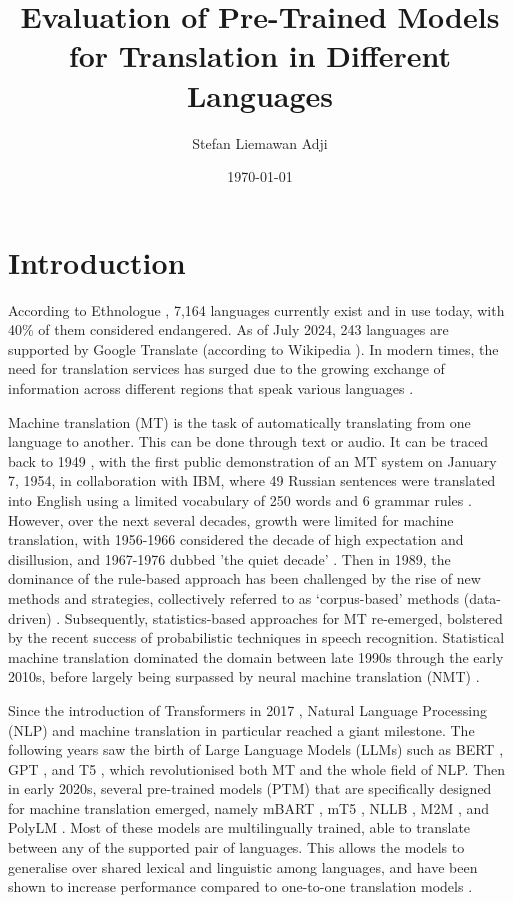 \documentclass[a4paper]{article}
\title{Evaluation of Pre-Trained Models for Translation in Different Languages}
\author{Stefan Liemawan Adji}
\date{\today}
\begin{document}
\maketitle

\section{Introduction}

According to Ethnologue \cite{ethnologue-2024}, 7,164 languages currently exist and in use today, with 40\% of them considered endangered. As of July 2024, 243 languages are supported by Google Translate (according to Wikipedia \cite{wikipedia-google-translate}). In modern times, the need for translation services has surged due to the growing exchange of information across different regions that speak various languages \cite{okpor-2014-machine-ta}.

Machine translation (MT) is the task of automatically translating from one language to another. This can be done through text or audio. It can be traced back to 1949 \cite{weaver-1999}, with the first public demonstration of an MT system on January 7, 1954, in collaboration with IBM, where 49 Russian sentences were translated into English using a limited vocabulary of 250 words and 6 grammar rules \cite{hutchins-2006-first-mt}. However, over the next several decades, growth were limited for machine translation, with 1956-1966 considered the decade of high expectation and disillusion, and 1967-1976 dubbed 'the quiet decade' \cite{hutchins-2001-mt-50-years}. Then in 1989, the dominance of the rule-based approach has been challenged by the rise of new methods and strategies, collectively referred to as ‘corpus-based’ methods (data-driven) \cite{hutchins-1994-research-methods-mt,hutchins-1998-development-mt}. Subsequently, statistics-based approaches for MT re-emerged, bolstered by the recent success of probabilistic techniques in speech recognition. Statistical machine translation \cite{lopez-2008-smt} dominated the domain between late 1990s through the early 2010s, before largely being surpassed by neural machine translation (NMT) \cite{cho-2014-properties,sutskever-2014-seq2seq}.

Since the introduction of Transformers in 2017 \cite{vaswani-2017-attention}, Natural Language Processing (NLP) and machine translation in particular reached a giant milestone. The following years saw the birth of Large Language Models (LLMs) such as BERT \cite{devlin-2019-bert}, GPT \cite{openai-2024-gpt4}, and T5 \cite{raffel-2023-t5}, which revolutionised both MT and the whole field of NLP. Then in early 2020s, several pre-trained models (PTM) that are specifically designed for machine translation emerged, namely mBART \cite{liu-2020-mbart}, mT5 \cite{xue-2021-mt5}, NLLB \cite{nllb200-2020}, M2M \cite{fan-2020-m2m100}, and PolyLM \cite{wei-2023-polylm}. Most of these models are multilingually trained, able to translate between any of the supported pair of languages. This allows the models to generalise over shared lexical and linguistic among languages, and have been shown to increase performance compared to one-to-one translation models \cite{liu-2020-mbart}.
\end{document}

